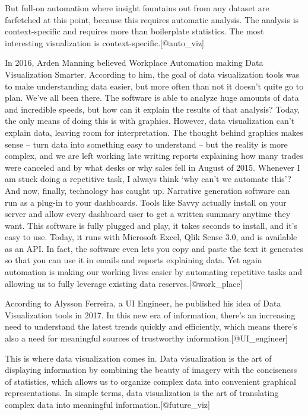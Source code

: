 \documentclass[]{book}
\theoremstyle{definition}
\theoremstyle{definition}
\theoremstyle{definition}
\theoremstyle{remark}
\begin{document}
But full-on automation where insight fountains out from any dataset are
farfetched at this point, because this requires automatic analysis. The
analysis is context-specific and requires more than boilerplate
statistics. The most interesting visualization is
context-specific.{[}@auto\_viz{]}

In 2016, Arden Manning believed Workplace Automation making Data
Visualization Smarter. According to him, the goal of data visualization
tools was to make understanding data easier, but more often than not it
doesn't quite go to plan. We've all been there. The software is able to
analyze huge amounts of data and incredible speeds, but how can it
explain the results of that analysis? Today, the only means of doing
this is with graphics. However, data visualization can't explain data,
leaving room for interpretation. The thought behind graphics makes sense
-- turn data into something easy to understand -- but the reality is
more complex, and we are left working late writing reports explaining
how many trades were canceled and by what desks or why sales fell in
August of 2015. Whenever I am stuck doing a repetitive task, I always
think `why can't we automate this'? And now, finally, technology has
caught up. Narrative generation software can run as a plug-in to your
dashboards. Tools like Savvy actually install on your server and allow
every dashboard user to get a written summary anytime they want. This
software is fully plugged and play, it takes seconds to install, and
it's easy to use. Today, it runs with Microsoft Excel, Qlik Sense 3.0,
and is available as an API. In fact, the software even lets you copy and
paste the text it generates so that you can use it in emails and reports
explaining data. Yet again automation is making our working lives easier
by automating repetitive tasks and allowing us to fully leverage
existing data reserves.{[}@work\_place{]}

According to Alysson Ferreira, a UI Engineer, he published his idea of
Data Visualization tools in 2017. In this new era of information,
there's an increasing need to understand the latest trends quickly and
efficiently, which means there's also a need for meaningful sources of
trustworthy information.{[}@UI\_engineer{]}

This is where data visualization comes in. Data visualization is the art
of displaying information by combining the beauty of imagery with the
conciseness of statistics, which allows us to organize complex data into
convenient graphical representations. In simple terms, data
visualization is the art of translating complex data into meaningful
information.{[}@future\_viz{]}
\end{document}
